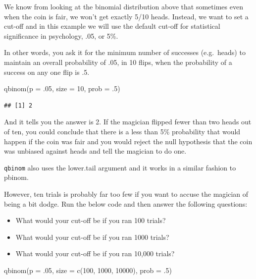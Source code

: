 \documentclass[
  oneside]{book}
\newenvironment{Shaded}{\begin{snugshade}}{\end{snugshade}}
\newcommand{\AttributeTok}[1]{\textcolor[rgb]{0.77,0.63,0.00}{#1}}
\newcommand{\DecValTok}[1]{\textcolor[rgb]{0.00,0.00,0.81}{#1}}
\newcommand{\FunctionTok}[1]{\textcolor[rgb]{0.00,0.00,0.00}{#1}}
\newcommand{\NormalTok}[1]{#1}
\providecommand{\tightlist}{%
  \setlength{\itemsep}{0pt}\setlength{\parskip}{0pt}}
\begin{document}
We know from looking at the binomial distribution above that sometimes even when the coin is fair, we won't get exactly 5/10 heads. Instead, we want to set a cut-off and in this example we will use the default cut-off for statistical significance in psychology, .05, or 5\%.

In other words, you ask it for the minimum number of successes (e.g.~heads) to maintain an overall probability of .05, in 10 flips, when the probability of a success on any one flip is .5.

\begin{Shaded}
\begin{Highlighting}[]
\FunctionTok{qbinom}\NormalTok{(}\AttributeTok{p =}\NormalTok{ .}\DecValTok{05}\NormalTok{, }\AttributeTok{size =} \DecValTok{10}\NormalTok{, }\AttributeTok{prob =}\NormalTok{ .}\DecValTok{5}\NormalTok{)}
\end{Highlighting}
\end{Shaded}

\begin{verbatim}
## [1] 2
\end{verbatim}

And it tells you the answer is 2. If the magician flipped fewer than two heads out of ten, you could conclude that there is a less than 5\% probability that would happen if the coin was fair and you would reject the null hypothesis that the coin was unbiased against heads and tell the magician to do one.

\texttt{qbinom} also uses the lower.tail argument and it works in a similar fashion to pbinom.

However, ten trials is probably far too few if you want to accuse the magician of being a bit dodge. Run the below code and then answer the following questions:

\begin{itemize}
\tightlist
\item
  What would your cut-off be if you ran 100 trials?
\item
  What would your cut-off be if you ran 1000 trials?
\item
  What would your cut-off be if you ran 10,000 trials?
\end{itemize}

\begin{Shaded}
\begin{Highlighting}[]
\FunctionTok{qbinom}\NormalTok{(}\AttributeTok{p =}\NormalTok{ .}\DecValTok{05}\NormalTok{, }\AttributeTok{size =} \FunctionTok{c}\NormalTok{(}\DecValTok{100}\NormalTok{, }\DecValTok{1000}\NormalTok{, }\DecValTok{10000}\NormalTok{), }\AttributeTok{prob =}\NormalTok{ .}\DecValTok{5}\NormalTok{)}
\end{Highlighting}
\end{Shaded}
\end{document}
